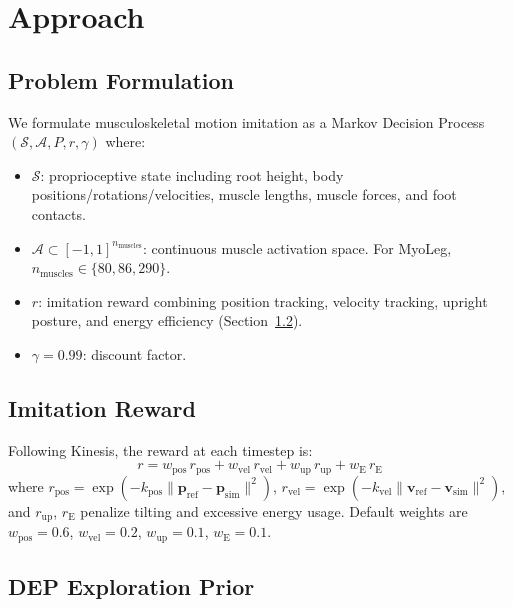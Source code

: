 \documentclass[10pt,twocolumn]{article}
\begin{document}
\section{Approach}
\label{sec:approach}

\subsection{Problem Formulation}

We formulate musculoskeletal motion imitation as a Markov Decision Process $(\mathcal{S}, \mathcal{A}, P, r, \gamma)$ where:
\begin{itemize}[nosep, leftmargin=*]
\item $\mathcal{S}$: proprioceptive state including root height, body positions/rotations/velocities, muscle lengths, muscle forces, and foot contacts.
\item $\mathcal{A} \subset [-1, 1]^{n_\text{muscles}}$: continuous muscle activation space. For MyoLeg, $n_\text{muscles} \in \{80, 86, 290\}$.
\item $r$: imitation reward combining position tracking, velocity tracking, upright posture, and energy efficiency (Section~\ref{sec:reward}).
\item $\gamma = 0.99$: discount factor.
\end{itemize}

\subsection{Imitation Reward}
\label{sec:reward}

Following Kinesis, the reward at each timestep is:
\begin{equation}
r = w_\text{pos}\, r_\text{pos} + w_\text{vel}\, r_\text{vel} + w_\text{up}\, r_\text{up} + w_\text{E}\, r_\text{E}
\end{equation}
where $r_\text{pos} = \exp(-k_\text{pos} \| \mathbf{p}_\text{ref} - \mathbf{p}_\text{sim} \|^2)$, $r_\text{vel} = \exp(-k_\text{vel} \| \mathbf{v}_\text{ref} - \mathbf{v}_\text{sim} \|^2)$, and $r_\text{up}$, $r_\text{E}$ penalize tilting and excessive energy usage. Default weights are $w_\text{pos}=0.6$, $w_\text{vel}=0.2$, $w_\text{up}=0.1$, $w_\text{E}=0.1$.

\subsection{DEP Exploration Prior}
\end{document}
